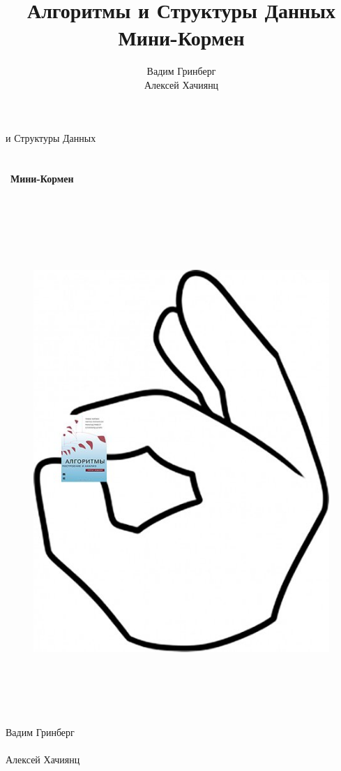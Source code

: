\documentclass[a4paper,12pt]{article}
\title{\Huge{Алгоритмы и Структуры Данных \\ Мини-Кормен}}
\author{Вадим Гринберг \\ Алексей Хачиянц}
\date{}
\begin{document}
\begin{titlepage}
  \begin{center}
  
  	{ и Структуры Данных}
	\\ \
	\\ \
	\\ \
	{\Huge \textbf{Мини-Кормен}}
    \\ \
    \\ \
    
    \begin{figure}[h]
    \begin{center}
        \begin{minipage}[h]{0.8\linewidth}
        \includegraphics[height=18cm, width=\linewidth]{mini-kormen.jpg}
        \end{minipage}
    \end{center}
    \end{figure}
    \ \\
    
    {\Large Вадим Гринберг} \\ 
    \ \\ 
    {\Large Алексей Хачиянц} \\ 
   
\end{center}
\end{titlepage}
\end{document}
